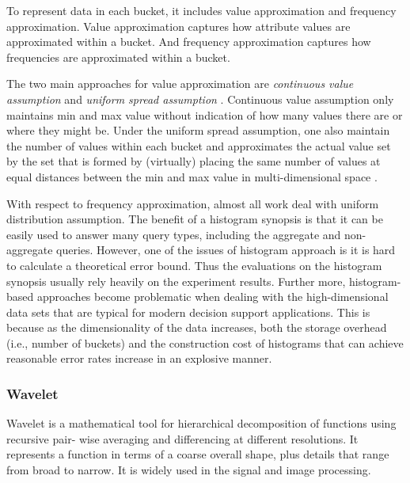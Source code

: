 \documentclass[twocolumn]{article}
\begin{document}
To represent data in each bucket, it includes value approximation and frequency approximation. Value approximation captures how attribute values are approximated within a bucket. And frequency approximation captures how frequencies are approximated within a bucket.

The two main approaches for value approximation are \textit{continuous value assumption} and \textit{uniform spread assumption} \cite{Poosala:1996}.
Continuous value assumption only maintains min and max value without indication of how many values there are or where they might be. Under the uniform spread assumption, one also maintain the number of values within each bucket and approximates the actual value set by the set that is formed by (virtually) placing the same number of values at equal distances between the min and max value in multi-dimensional space \cite{Ioannidis:2003}.

With respect to frequency approximation, almost all work deal with uniform distribution assumption.
The benefit of a histogram synopsis is that it can be easily used to answer many query types, including the aggregate and non-aggregate queries. However, one of the issues of histogram approach is it is hard to calculate a theoretical error bound. Thus the evaluations on the histogram synopsis usually rely heavily on the experiment results. Further more, histogram-based approaches become problematic when dealing with the high-dimensional data sets that are typical for modern decision support applications. This is because as the dimensionality of the data increases, both the storage overhead (i.e., number of buckets) and the construction cost of histograms that can achieve reasonable error rates increase in an explosive manner.

\subsubsection*{Wavelet} 
Wavelet is a mathematical tool for hierarchical decomposition of functions using recursive pair- wise averaging and differencing at different resolutions. It represents a function in terms of a coarse overall shape, plus details that range from broad to narrow. It is widely used in the signal and image processing.
\end{document}
